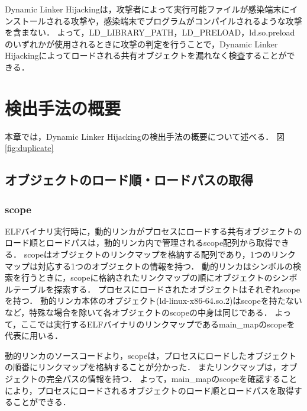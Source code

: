 \documentclass[submit,techreq,noauthor]{eco}	%
\begin{document}
 Dynamic Linker Hijackingは，攻撃者によって実行可能ファイルが感染端末にインストールされる攻撃や，感染端末でプログラムがコンパイルされるような攻撃を含まない．
 よって，LD\_LIBRARY\_PATH，LD\_PRELOAD，ld.so.preloadのいずれかが使用されるときに攻撃の判定を行うことで，Dynamic Linker Hijackingによってロードされる共有オブジェクトを漏れなく検査することができる．\\



\section{検出手法の概要}
本章では，Dynamic Linker Hijackingの検出手法の概要について述べる．
図\ref{fig:duplicate}


\subsection{オブジェクトのロード順・ロードパスの取得}
\subsubsection{scope}
ELFバイナリ実行時に，動的リンカがプロセスにロードする共有オブジェクトのロード順とロードパスは，動的リンカ内で管理されるscope配列から取得できる．
scopeはオブジェクトのリンクマップを格納する配列であり，1つのリンクマップは対応する1つのオブジェクトの情報を持つ．
動的リンカはシンボルの検索を行うときに，scopeに格納されたリンクマップの順にオブジェクトのシンボルテーブルを探索する．
プロセスにロードされたオブジェクトはそれぞれscopeを持つ．
動的リンカ本体のオブジェクト(ld-linux-x86-64.so.2)はscopeを持たないなど，特殊な場合を除いて各オブジェクトのscopeの中身は同じである．
よって，ここでは実行するELFバイナリのリンクマップであるmain\_mapのscopeを代表に用いる．

動的リンカのソースコードより，scopeは，プロセスにロードしたオブジェクトの順番にリンクマップを格納することが分かった．
またリンクマップは，オブジェクトの完全パスの情報を持つ．
よって，main\_mapのscopeを確認することにより，プロセスにロードされるオブジェクトのロード順とロードパスを取得することができる．\\
\end{document}
